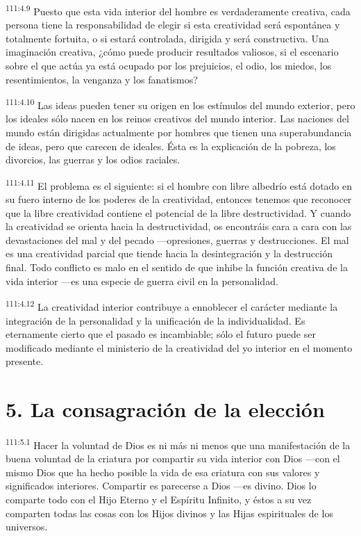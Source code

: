 \documentclass[twoside, 11pt]{book}
\begin{document}
\par
\textsuperscript{111:4.9} Puesto que esta vida interior del hombre es verdaderamente creativa, cada persona tiene la responsabilidad de elegir si esta creatividad será espontánea y totalmente fortuita, o si estará controlada, dirigida y será constructiva. Una imaginación creativa, ¿cómo puede producir resultados valiosos, si el escenario sobre el que actúa ya está ocupado por los prejuicios, el odio, los miedos, los resentimientos, la venganza y los fanatismos?

\par
\textsuperscript{111:4.10} Las ideas pueden tener su origen en los estímulos del mundo exterior, pero los ideales sólo nacen en los reinos creativos del mundo interior. Las naciones del mundo están dirigidas actualmente por hombres que tienen una superabundancia de ideas, pero que carecen de ideales. Ésta es la explicación de la pobreza, los divorcios, las guerras y los odios raciales.

\par
\textsuperscript{111:4.11} El problema es el siguiente: si el hombre con libre albedrío está dotado en su fuero interno de los poderes de la creatividad, entonces tenemos que reconocer que la libre creatividad contiene el potencial de la libre destructividad. Y cuando la creatividad se orienta hacia la destructividad, os encontráis cara a cara con las devastaciones del mal y del pecado ---opresiones, guerras y destrucciones. El mal es una creatividad parcial que tiende hacia la desintegración y la destrucción final. Todo conflicto es malo en el sentido de que inhibe la función creativa de la vida interior ---es una especie de guerra civil en la personalidad.

\par
\textsuperscript{111:4.12} La creatividad interior contribuye a ennoblecer el carácter mediante la integración de la personalidad y la unificación de la individualidad. Es eternamente cierto que el pasado es incambiable; sólo el futuro puede ser modificado mediante el ministerio de la creatividad del yo interior en el momento presente.

\section*{5. La consagración de la elección}
\par
\textsuperscript{111:5.1} Hacer la voluntad de Dios es ni más ni menos que una manifestación de la buena voluntad de la criatura por compartir su vida interior con Dios ---con el mismo Dios que ha hecho posible la vida de esa criatura con sus valores y significados interiores. Compartir es parecerse a Dios ---es divino. Dios lo comparte todo con el Hijo Eterno y el Espíritu Infinito, y éstos a su vez comparten todas las cosas con los Hijos divinos y las Hijas espirituales de los universos.
\end{document}
